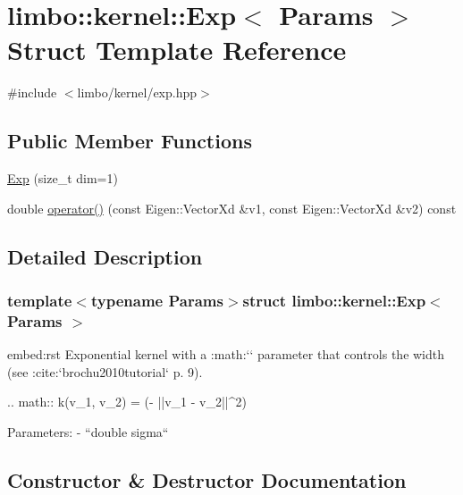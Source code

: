\hypertarget{structlimbo_1_1kernel_1_1_exp}{}\section{limbo\+:\+:kernel\+:\+:Exp$<$ Params $>$ Struct Template Reference}
\label{structlimbo_1_1kernel_1_1_exp}


{\ttfamily \#include $<$limbo/kernel/exp.\+hpp$>$}

\subsection*{Public Member Functions}
\begin{DoxyCompactItemize}
\item 
\hyperlink{structlimbo_1_1kernel_1_1_exp_abec48720f518fa51be7f74bf102add09}{Exp} (size\+\_\+t dim=1)
\item 
double \hyperlink{structlimbo_1_1kernel_1_1_exp_a50951330db2210da72d2ea8fc9ef8b96}{operator()} (const Eigen\+::\+Vector\+Xd \&v1, const Eigen\+::\+Vector\+Xd \&v2) const 
\end{DoxyCompactItemize}


\subsection{Detailed Description}
\subsubsection*{template$<$typename Params$>$struct limbo\+::kernel\+::\+Exp$<$ Params $>$}

\begin{DoxyVerb}embed:rst
Exponential kernel with a :math:`\sigma` parameter that controls the width (see :cite:`brochu2010tutorial` p. 9).

.. math::
    k(v_1, v_2)  = \exp \Big(- ||v_1 - v_2||^2\Big)

Parameters:
  - ``double sigma``
\end{DoxyVerb}
 

\subsection{Constructor \& Destructor Documentation}
\hypertarget{structlimbo_1_1kernel_1_1_exp_abec48720f518fa51be7f74bf102add09}{}
